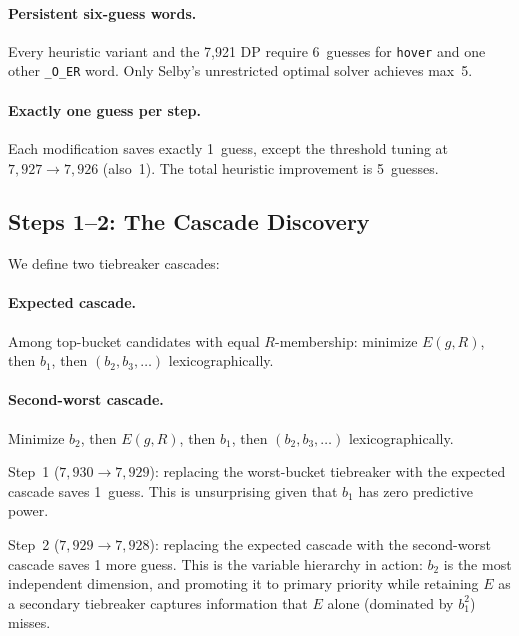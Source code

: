 \documentclass[11pt]{article}
\begin{document}
	\paragraph{Persistent six-guess words.}
	Every heuristic variant and the 7,921 DP require 6~guesses for \texttt{hover} and one other \texttt{\_O\_ER} word.  Only Selby's unrestricted optimal solver achieves max~5.
	
	\paragraph{Exactly one guess per step.}
	Each modification saves exactly 1~guess, except the threshold tuning at $7{,}927 \to 7{,}926$ (also~1).  The total heuristic improvement is 5~guesses.
	
	\subsection{Steps 1--2: The Cascade Discovery}
	\label{sec:cascade}
	
	We define two tiebreaker cascades:
	
	\paragraph{Expected cascade.}
	Among top-bucket candidates with equal $R$-membership: minimize $E(g,R)$, then $b_1$, then $(b_2, b_3, \ldots)$ lexicographically.
	
	\paragraph{Second-worst cascade.}
	Minimize $b_2$, then $E(g,R)$, then $b_1$, then $(b_2, b_3, \ldots)$ lexicographically.
	
	Step~1 ($7{,}930 \to 7{,}929$): replacing the worst-bucket tiebreaker with the expected cascade saves 1~guess.  This is unsurprising given that $b_1$ has zero predictive power.
	
	Step~2 ($7{,}929 \to 7{,}928$): replacing the expected cascade with the second-worst cascade saves 1 more guess.  This is the variable hierarchy in action: $b_2$ is the most independent dimension, and promoting it to primary priority while retaining $E$ as a secondary tiebreaker captures information that $E$ alone (dominated by $b_1^2$) misses.
	
\end{document}

